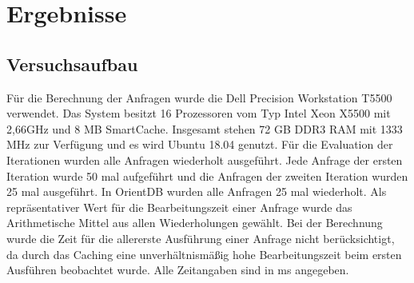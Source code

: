 
\chapter{Ergebnisse} %

\label{Kaptiel4} %

\section{Versuchsaufbau}
Für die Berechnung der Anfragen wurde die Dell Precision Workstation T5500 verwendet. Das System besitzt 16 Prozessoren vom Typ Intel Xeon  X5500 mit 2,66GHz und  8 MB SmartCache. Insgesamt stehen 72 GB DDR3 RAM mit 1333 MHz zur Verfügung und es wird Ubuntu 18.04 genutzt. Für die Evaluation der Iterationen wurden alle Anfragen wiederholt ausgeführt. \newline
 Jede Anfrage der ersten Iteration wurde 50 mal aufgeführt und die Anfragen der zweiten Iteration wurden 25 mal ausgeführt. In OrientDB wurden alle Anfragen 25 mal wiederholt. Als repräsentativer Wert für die Bearbeitungszeit einer Anfrage  wurde das Arithmetische Mittel aus allen Wiederholungen gewählt. Bei der Berechnung wurde die Zeit für die allererste Ausführung einer Anfrage nicht berücksichtigt, da durch das Caching eine unverhältnismäßig hohe Bearbeitungszeit beim ersten Ausführen beobachtet wurde. Alle Zeitangaben sind in ms angegeben. 
